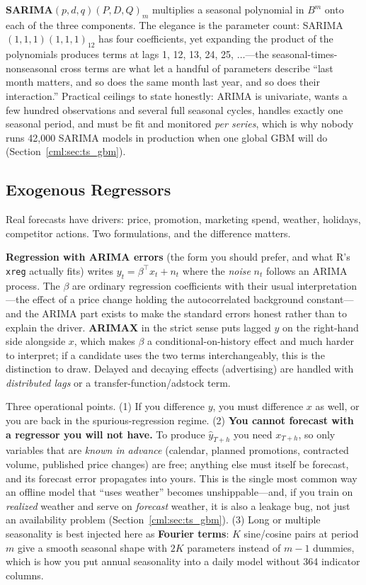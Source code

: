 \textbf{SARIMA$(p,d,q)(P,D,Q)_m$} multiplies a seasonal polynomial in $B^m$ onto each of the three components. The elegance is the parameter count: SARIMA$(1,1,1)(1,1,1)_{12}$ has four coefficients, yet expanding the product of the polynomials produces terms at lags 1, 12, 13, 24, 25, $\ldots$---the seasonal-times-nonseasonal cross terms are what let a handful of parameters describe ``last month matters, and so does the same month last year, and so does their interaction.'' Practical ceilings to state honestly: ARIMA is univariate, wants a few hundred observations and several full seasonal cycles, handles exactly one seasonal period, and must be fit and monitored \emph{per series}, which is why nobody runs 42{,}000 SARIMA models in production when one global GBM will do (Section~\ref{cml:sec:ts_gbm}).

\subsection{Exogenous Regressors}

Real forecasts have drivers: price, promotion, marketing spend, weather, holidays, competitor actions. Two formulations, and the difference matters.

\textbf{Regression with ARIMA errors} (the form you should prefer, and what R's \texttt{xreg} actually fits) writes $y_t = \beta^{\top} x_t + n_t$ where the \emph{noise} $n_t$ follows an ARIMA process. The $\beta$ are ordinary regression coefficients with their usual interpretation---the effect of a price change holding the autocorrelated background constant---and the ARIMA part exists to make the standard errors honest rather than to explain the driver. \textbf{ARIMAX} in the strict sense puts lagged $y$ on the right-hand side alongside $x$, which makes $\beta$ a conditional-on-history effect and much harder to interpret; if a candidate uses the two terms interchangeably, this is the distinction to draw. Delayed and decaying effects (advertising) are handled with \emph{distributed lags} or a transfer-function/adstock term.

Three operational points. (1) If you difference $y$, you must difference $x$ as well, or you are back in the spurious-regression regime. (2) \textbf{You cannot forecast with a regressor you will not have.} To produce $\hat{y}_{T+h}$ you need $x_{T+h}$, so only variables that are \emph{known in advance} (calendar, planned promotions, contracted volume, published price changes) are free; anything else must itself be forecast, and its forecast error propagates into yours. This is the single most common way an offline model that ``uses weather'' becomes unshippable---and, if you train on \emph{realized} weather and serve on \emph{forecast} weather, it is also a leakage bug, not just an availability problem (Section~\ref{cml:sec:ts_gbm}). (3) Long or multiple seasonality is best injected here as \textbf{Fourier terms}: $K$ sine/cosine pairs at period $m$ give a smooth seasonal shape with $2K$ parameters instead of $m-1$ dummies, which is how you put annual seasonality into a daily model without 364 indicator columns.


